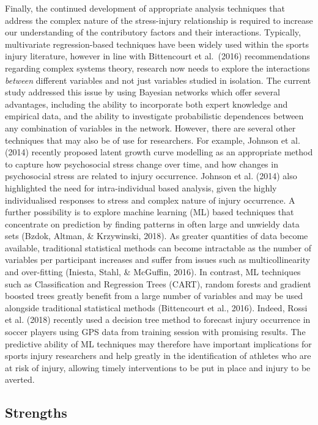 \documentclass[man,floatsintext]{apa6}
\begin{document}
Finally, the continued development of appropriate analysis techniques that address the complex nature of the stress-injury relationship is required to increase our understanding of the contributory factors and their interactions.
Typically, multivariate regression-based techniques have been widely used within the sports injury literature, however in line with Bittencourt et al.~(2016) recommendations regarding complex systems theory, research now needs to explore the interactions \emph{between} different variables and not just variables studied in isolation.
The current study addressed this issue by using Bayesian networks which offer several advantages, including the ability to incorporate both expert knowledge and empirical data, and the ability to investigate probabilistic dependences between any combination of variables in the network.
However, there are several other techniques that may also be of use for researchers.
For example, Johnson et al. (2014) recently proposed latent growth curve modelling as an appropriate method to capture how psychosocial stress change over time, and how changes in psychosocial stress are related to injury occurrence.
Johnson et al. (2014) also highlighted the need for intra-individual based analysis, given the highly individualised responses to stress and complex nature of injury occurrence.
A further possibility is to explore machine learning (ML) based techniques that concentrate on prediction by finding patterns in often large and unwieldy data sets (Bzdok, Altman, \& Krzywinski, 2018).
As greater quantities of data become available, traditional statistical methods can become intractable as the number of variables per participant increases and suffer from issues such as multicollinearity and over-fitting (Iniesta, Stahl, \& McGuffin, 2016).
In contrast, ML techniques such as Classification and Regression Trees (CART), random forests and gradient boosted trees greatly benefit from a large number of variables and may be used alongside traditional statistical methods (Bittencourt et al., 2016).
Indeed, Rossi et al. (2018) recently used a decision tree method to forecast injury occurrence in soccer players using GPS data from training session with promising results.
The predictive ability of ML techniques may therefore have important implications for sports injury researchers and help greatly in the identification of athletes who are at risk of injury, allowing timely interventions to be put in place and injury to be averted.

\hypertarget{strengths}{%
\subsection{Strengths}\label{strengths}}
\end{document}
